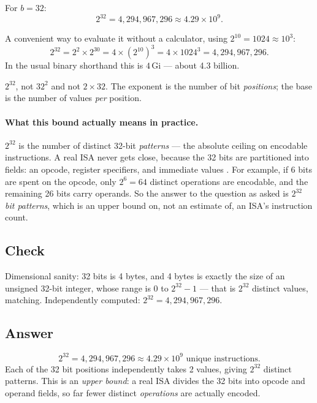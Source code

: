For $b = 32$:
\begin{equation}
  2^{32} = 4{,}294{,}967{,}296 \approx 4.29 \times 10^{9}.
\end{equation}

A convenient way to evaluate it without a calculator, using $2^{10} = 1024
\approx 10^{3}$:
\begin{equation}
  2^{32} = 2^{2} \times 2^{30} = 4 \times (2^{10})^{3}
         = 4 \times 1024^{3} = 4{,}294{,}967{,}296.
\end{equation}
In the usual binary shorthand this is $4\,\text{Gi}$ — about 4.3 billion.

\begin{trap}
$2^{32}$, not $32^{2}$ and not $2 \times 32$. The exponent is the number of bit
\emph{positions}; the base is the number of values \emph{per} position.
\end{trap}

\paragraph{What this bound actually means in practice.}
$2^{32}$ is the number of distinct 32-bit \emph{patterns} — the absolute ceiling
on encodable instructions. A real ISA never gets close, because the 32 bits are
partitioned into fields: an opcode, register specifiers, and immediate values
. For
example, if 6 bits are spent on the opcode, only $2^{6} = 64$ distinct
operations are encodable, and the remaining 26 bits carry operands. So the
answer to the question as asked is $2^{32}$ \emph{bit patterns}, which is an
upper bound on, not an estimate of, an ISA's instruction count.

\subsection*{Check}

Dimensional sanity: 32 bits is 4 bytes, and 4 bytes is exactly the size of an
unsigned 32-bit integer, whose range is $0$ to $2^{32}-1$ — that is $2^{32}$
distinct values, matching. Independently computed: $2^{32} = 4{,}294{,}967{,}296$.

\subsection*{Answer}

\begin{answerbox}
$$2^{32} = 4{,}294{,}967{,}296 \approx 4.29\times10^{9} \text{ unique instructions.}$$
Each of the 32 bit positions independently takes 2 values, giving $2^{32}$
distinct patterns. This is an \emph{upper bound}: a real ISA divides the 32 bits
into opcode and operand fields, so far fewer distinct \emph{operations} are
actually encoded.
\end{answerbox}


